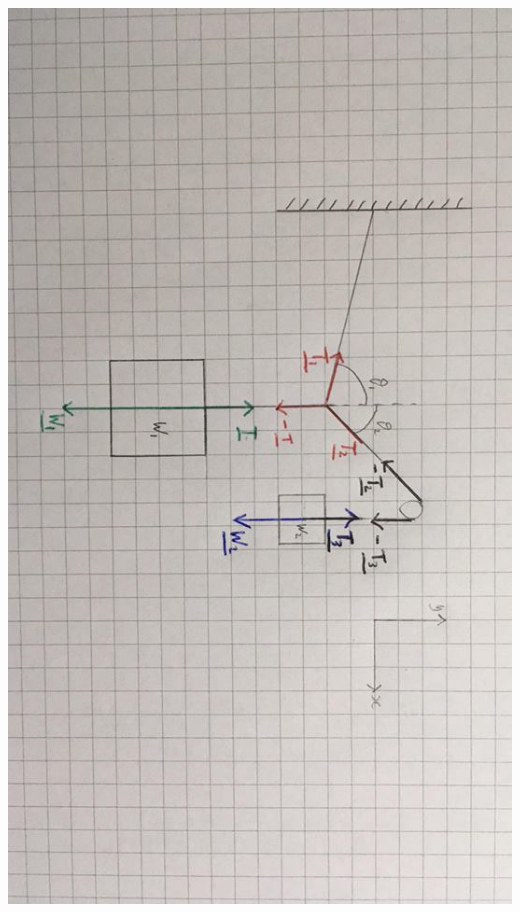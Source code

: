 \documentclass{article}
\begin{document}
\begin{enumerate}
\includegraphics[scale=0.2, angle=90]{Diagram3}


\end{enumerate}
\end{document}
